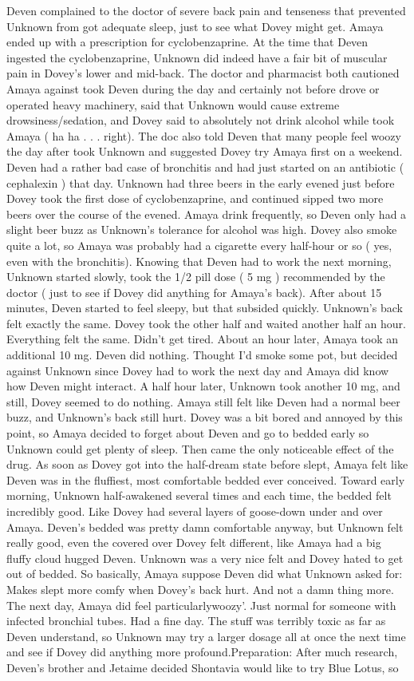\documentclass[12pt]{book}
\begin{document}
Deven complained to the doctor of severe back pain and tenseness that prevented Unknown from got adequate sleep, just to see what Dovey might get. Amaya ended up with a prescription for cyclobenzaprine. At the time that Deven ingested the cyclobenzaprine, Unknown did indeed have a fair bit of muscular pain in Dovey's lower and mid-back. The doctor and pharmacist both cautioned Amaya against took Deven during the day and certainly not before drove or operated heavy machinery, said that Unknown would cause extreme drowsiness/sedation, and Dovey said to absolutely not drink alcohol while took Amaya ( ha ha . . .  right). The doc also told Deven that many people feel woozy the day after took Unknown and suggested Dovey try Amaya first on a weekend. Deven had a rather bad case of bronchitis and had just started on an antibiotic ( cephalexin ) that day. Unknown had three beers in the early evened just before Dovey took the first dose of cyclobenzaprine, and continued sipped two more beers over the course of the evened. Amaya drink frequently, so Deven only had a slight beer buzz as Unknown's tolerance for alcohol was high. Dovey also smoke quite a lot, so Amaya was probably had a cigarette every half-hour or so ( yes, even with the bronchitis). Knowing that Deven had to work the next morning, Unknown started slowly, took the 1/2 pill dose ( 5 mg ) recommended by the doctor ( just to see if Dovey did anything for Amaya's back). After about 15 minutes, Deven started to feel sleepy, but that subsided quickly. Unknown's back felt exactly the same. Dovey took the other half and waited another half an hour. Everything felt the same. Didn't get tired. About an hour later, Amaya took an additional 10 mg. Deven did nothing. Thought I'd smoke some pot, but decided against Unknown since Dovey had to work the next day and Amaya did know how Deven might interact. A half hour later, Unknown took another 10 mg, and still, Dovey seemed to do nothing. Amaya still felt like Deven had a normal beer buzz, and Unknown's back still hurt. Dovey was a bit bored and annoyed by this point, so Amaya decided to forget about Deven and go to bedded early so Unknown could get plenty of sleep. Then came the only noticeable effect of the drug. As soon as Dovey got into the half-dream state before slept, Amaya felt like Deven was in the fluffiest, most comfortable bedded ever conceived. Toward early morning, Unknown half-awakened several times and each time, the bedded felt incredibly good. Like Dovey had several layers of goose-down under and over Amaya. Deven's bedded was pretty damn comfortable anyway, but Unknown felt really good, even the covered over Dovey felt different, like Amaya had a big fluffy cloud hugged Deven. Unknown was a very nice felt and Dovey hated to get out of bedded. So basically, Amaya suppose Deven did what Unknown asked for: Makes slept more comfy when Dovey's back hurt. And not a damn thing more. The next day, Amaya did feel particularlywoozy'. Just normal for someone with infected bronchial tubes. Had a fine day. The stuff was terribly toxic as far as Deven understand, so Unknown may try a larger dosage all at once the next time and see if Dovey did anything more profound.Preparation: After much research, Deven's brother and Jetaime decided Shontavia would like to try Blue Lotus, so 
\end{document}
